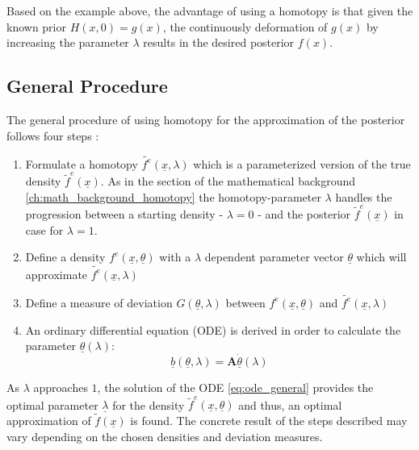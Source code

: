 \documentclass[a4paper]{IEEEtran}
\begin{document}
Based on the example above, the advantage of using a homotopy is that given the known prior $H(x,0)=g(x)$, the continuously deformation of $g(x)$ by increasing the parameter $\lambda$ 
results in the desired posterior $f(x)$. 

\subsection{General Procedure}
\label{ch:general_idea_homotopy}
The general procedure of using homotopy for the approximation of the posterior follows four steps \cite{hanebeck2003}:
\begin{enumerate}
    \item Formulate a homotopy $\tilde{f^e}(\underline{x},\lambda)$ which is a parameterized version of the true density $\tilde{f}^{e}(\underline{x})$. As in the section of the mathematical background \ref{ch:math_background_homotopy}
    the homotopy-parameter $\lambda$ handles the progression between a starting density - $\lambda = 0$ - and the posterior $\tilde{f}^e(\underline{x})$ in case for $\lambda = 1$.
    \item Define a density $f^e(\underline{x}, \underline{\theta})$ with a $\lambda$ dependent parameter vector $\underline{\theta}$ which will approximate $\tilde{f^e}(\underline{x},\lambda)$
    \item Define a measure of deviation $G(\underline{\theta}, \lambda)$ between $f^e(\underline{x}, \underline{\theta})$ and $\tilde{f^e}(\underline{x},\lambda)$
    \item An ordinary differential equation (ODE) is derived in order to calculate the parameter $\underline{\theta}(\lambda)$:
    \begin{equation}
        \underline{b}(\underline{\theta}, \lambda) = \textbf{A}\underline{\dot{\theta}}(\lambda)
        \label{eq:ode_general}
    \end{equation}
\end{enumerate}

As $\lambda$ approaches $1$, the solution of the ODE \eqref{eq:ode_general} provides the optimal parameter $\underline{\lambda}$ for the density $\tilde{f}^e(\underline{x}, \underline{\theta})$ and thus, an optimal approximation of $\tilde{f}(\underline{x})$ is found. The concrete result of the steps 
described may vary depending on the chosen densities and deviation measures.
\end{document}
